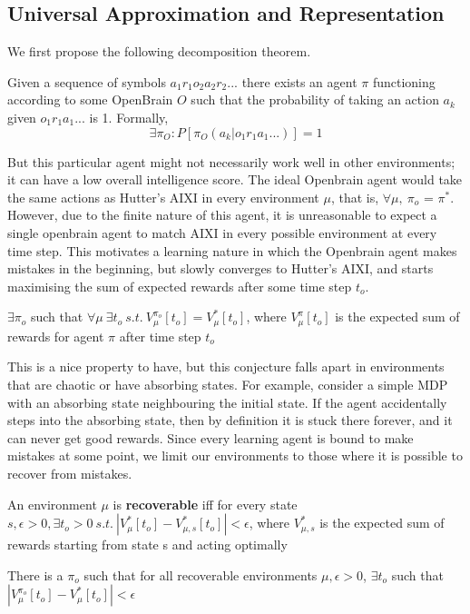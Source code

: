 \subsection{Universal Approximation and Representation}

We first propose the following decomposition theorem.



\begin{conjecture}
Given a sequence of symbols $a_1r_1o_2a_2r_2...$ there exists an agent $\pi$ functioning according to some OpenBrain $O$ such that the probability of taking an action $a_k$ given $o_1r_1a_1...$ is 1. Formally, 
$$\exists \pi_{O} : P[\pi_{O}(a_k|o_1r_1a_1...)] = 1$$ 
\end{conjecture}

But this particular agent might not necessarily work well in other environments; it can have a low overall intelligence score. The ideal Openbrain agent would take the same actions as Hutter's AIXI in every environment $\mu$, that is, $\forall \mu,\ \pi_o$ = $\pi^*$. However, due to the finite nature of this agent, it is unreasonable to expect a single openbrain agent to match AIXI in every possible environment at every time step. This motivates a learning nature in which the Openbrain agent makes mistakes in the beginning, but slowly converges to Hutter's AIXI, and starts maximising the sum of expected rewards after some time step $t_o$.

\begin{conjecture}
    $\exists \pi_o$ such that $\forall \mu \ \exists t_o \ s.t.\  V_\mu^{\pi_o}[t_o] = V_\mu^*[t_o] $, where $V_\mu^{\pi}[t_o]$ is the expected sum of rewards for agent $\pi$ after time step $t_o$
\end{conjecture}

This is a nice property to have, but this conjecture falls apart in environments that are chaotic or have absorbing states. For example, consider a simple MDP with an absorbing state neighbouring the initial state. If the agent accidentally steps into the absorbing state, then by definition it is stuck there forever, and it can never get good rewards. Since every learning agent is bound to make mistakes at some point, we limit our environments to those where it is possible to recover from mistakes.

\begin{definition}
    An environment $\mu$ is \textbf{recoverable} iff for every state $s, \epsilon > 0, \exists t_o > 0\  s.t.\ |V_\mu^*[t_o]-V_{\mu,s}^*[t_o]| < \epsilon$, where $V_{\mu,s}^*$ is the expected sum of rewards starting from state s and acting optimally
\end{definition}


\begin{conjecture}
    There is a $\pi_o$ such that for all recoverable environments $\mu, \epsilon > 0$, $\exists t_o$ such that $|V_\mu^{\pi_o}[t_o]-V_\mu^*[t_o]|<\epsilon$
\end{conjecture}